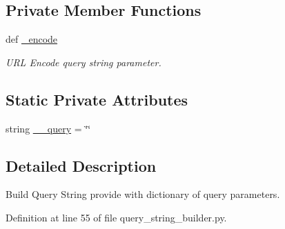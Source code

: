 \subsection*{Private Member Functions}
\begin{DoxyCompactItemize}
\item 
def \hyperlink{classtune_1_1management_1_1service_1_1query__string__builder_1_1QueryStringBuilder_a0b965e40a56591054bb62d0178bbe8b9}{\-\_\-encode}
\begin{DoxyCompactList}\small\item\em U\-R\-L Encode query string parameter. \end{DoxyCompactList}\end{DoxyCompactItemize}
\subsection*{Static Private Attributes}
\begin{DoxyCompactItemize}
\item 
string \hyperlink{classtune_1_1management_1_1service_1_1query__string__builder_1_1QueryStringBuilder_a51080f1efb7e53b5df7c2ee223f73660}{\-\_\-\-\_\-query} = \char`\"{}\char`\"{}
\end{DoxyCompactItemize}


\subsection{Detailed Description}
Build Query String provide with dictionary of query parameters. 



Definition at line 55 of file query\-\_\-string\-\_\-builder.\-py.



